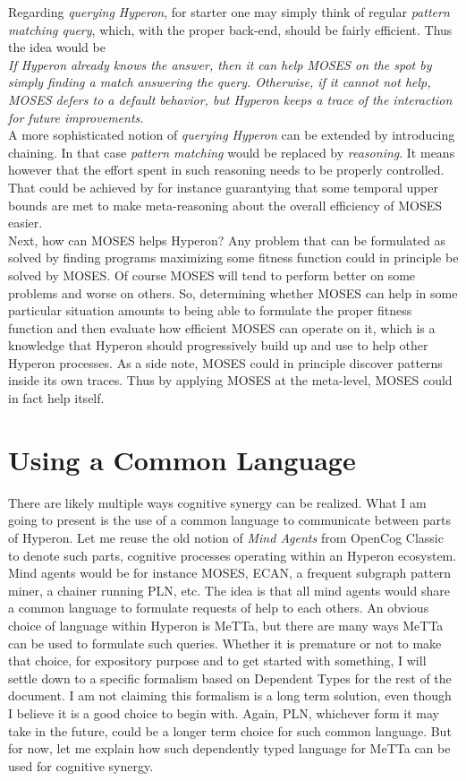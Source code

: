 \documentclass[]{report}
\begin{document}
Regarding \emph{querying Hyperon}, for starter one may simply think of
regular \emph{pattern matching query}, which, with the proper
back-end, should be fairly efficient.  Thus the idea would be\\

\emph{If Hyperon already knows the answer, then it can help MOSES on
the spot by simply finding a match answering the query.  Otherwise, if
it cannot not help, MOSES defers to a default behavior, but Hyperon
keeps a trace of the interaction for future improvements.}\\

A more sophisticated notion of \emph{querying Hyperon} can be extended
by introducing chaining.  In that case \emph{pattern matching} would
be replaced by \emph{reasoning}.  It means however that the effort
spent in such reasoning needs to be properly controlled.  That could
be achieved by for instance guarantying that some temporal upper
bounds are met to make meta-reasoning about the overall efficiency of
MOSES easier.\\

Next, how can MOSES helps Hyperon? Any problem that can be formulated
as solved by finding programs maximizing some fitness function could
in principle be solved by MOSES.  Of course MOSES will tend to perform
better on some problems and worse on others.  So, determining whether
MOSES can help in some particular situation amounts to being able to
formulate the proper fitness function and then evaluate how efficient
MOSES can operate on it, which is a knowledge that Hyperon should
progressively build up and use to help other Hyperon processes.  As a
side note, MOSES could in principle discover patterns inside its own
traces.  Thus by applying MOSES at the meta-level, MOSES could in fact
help itself.

\section{Using a Common Language}

There are likely multiple ways cognitive synergy can be realized.
What I am going to present is the use of a common language to
communicate between parts of Hyperon.  Let me reuse the old notion of
\emph{Mind Agents} from OpenCog Classic to denote such parts,
cognitive processes operating within an Hyperon ecosystem.  Mind
agents would be for instance MOSES, ECAN, a frequent subgraph pattern
miner, a chainer running PLN, etc.  The idea is that all mind agents
would share a common language to formulate requests of help to each
others.  An obvious choice of language within Hyperon is MeTTa, but
there are many ways MeTTa can be used to formulate such queries.
Whether it is premature or not to make that choice, for expository
purpose and to get started with something, I will settle down to a
specific formalism based on Dependent Types for the rest of the
document.  I am not claiming this formalism is a long term solution,
even though I believe it is a good choice to begin with.  Again, PLN,
whichever form it may take in the future, could be a longer term
choice for such common language.  But for now, let me explain how such
dependently typed language for MeTTa can be used for cognitive
synergy.
\end{document}
